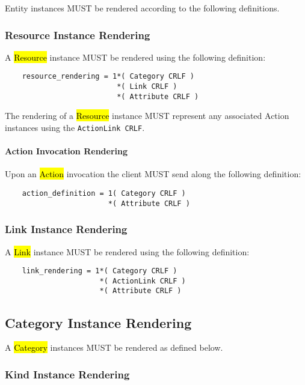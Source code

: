 \documentclass[10pt,a4paper]{article}
\begin{document}
Entity instances MUST be rendered according to the following definitions.

\subsubsection{Resource Instance Rendering}

A \hl{Resource} instance MUST be rendered using the following definition:

\begin{verbatim}
	resource_rendering = 1*( Category CRLF )
    	                  *( Link CRLF )
        	              *( Attribute CRLF )
\end{verbatim}

The rendering of a \hl{Resource} instance MUST represent any associated Action instances using the {\tt ActionLink CRLF}.

\paragraph{Action Invocation Rendering}

Upon an \hl{Action} invocation the client MUST send along the following definition:

\begin{verbatim}
	action_definition = 1( Category CRLF )
        	            *( Attribute CRLF )
\end{verbatim}

\subsubsection{Link Instance Rendering}

A \hl{Link} instance MUST be rendered using the following definition:

\begin{verbatim}
	link_rendering = 1*( Category CRLF )
    	              *( ActionLink CRLF )
        	          *( Attribute CRLF )
\end{verbatim}


\subsection{Category Instance Rendering}
\label{sec:format_category_instance_rendering}

A \hl{Category} instances MUST be rendered as defined below.

\subsubsection{Kind Instance Rendering}
\label{sec:format_kind}
\end{document}
